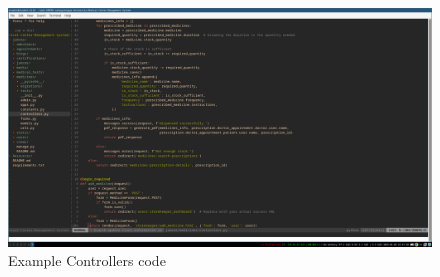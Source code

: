 \documentclass[a4paper,12pt]{article}
\begin{document}
\begin{figure}[H]
    \centering
    \includegraphics[width=1\textwidth]{images/meet201.png}   
    \caption{Example Controllers code}
    \label{fig:meet201}
\end{figure}
\end{document}
